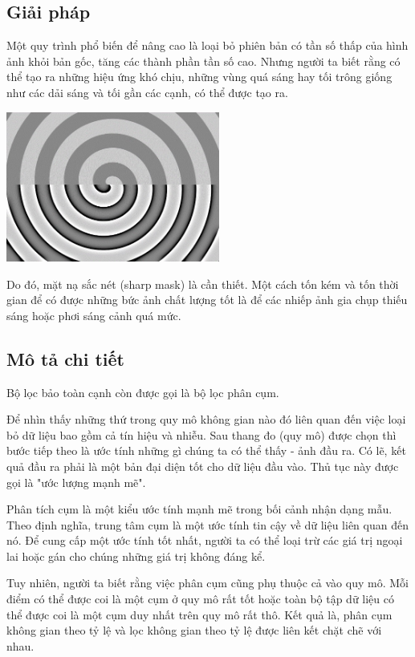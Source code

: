\documentclass[12pt,letterpaper]{report}
\begin{document}
\subsection{Giải pháp}
	
Một quy trình phổ biến để nâng cao là loại bỏ phiên bản có tần số thấp của hình ảnh khỏi bản gốc, tăng các thành phần tần số cao. Nhưng người ta biết rằng có thể tạo ra những hiệu ứng khó chịu, những vùng quá sáng hay tối trông giống như các dải sáng và tối gần các cạnh, có thể được tạo ra.

\begin{center}
	\includegraphics[width=7cm]{image4.jpg}
\end{center}
	
Do đó, mặt nạ sắc nét (sharp mask) là cần thiết. Một cách tốn kém và tốn thời gian để có được những bức ảnh chất lượng tốt là để các nhiếp ảnh gia chụp thiếu sáng hoặc phơi sáng cảnh quá mức.
	
\subsection{Mô tả chi tiết}
    
Bộ lọc bảo toàn cạnh còn được gọi là bộ lọc phân cụm.
    
Để nhìn thấy những thứ trong quy mô không gian nào đó liên quan đến việc loại bỏ dữ liệu bao gồm cả tín hiệu và nhiễu. Sau thang đo (quy mô) được chọn thì bước tiếp theo là ước tính những gì chúng ta có thể thấy - ảnh đầu ra. Có lẽ, kết quả đầu ra phải là một bản đại diện tốt cho dữ liệu đầu vào. Thủ tục này được gọi là "ước lượng mạnh mẽ".
    
Phân tích cụm là một kiểu ước tính mạnh mẽ trong bối cảnh nhận dạng mẫu. Theo định nghĩa, trung tâm cụm là một ước tính tin cậy về dữ liệu liên quan đến nó. Để cung cấp một ước tính tốt nhất, người ta có thể loại trừ các giá trị ngoại lai hoặc gán cho chúng những giá trị không đáng kể.
    
Tuy nhiên, người ta biết rằng việc phân cụm cũng phụ thuộc cả vào quy mô. Mỗi điểm có thể được coi là một cụm ở quy mô rất tốt hoặc toàn bộ tập dữ liệu có thể được coi là một cụm duy nhất trên quy mô rất thô. Kết quả là, phân cụm không gian theo tỷ lệ và lọc không gian theo tỷ lệ được liên kết chặt chẽ với nhau.
    
\end{document}
